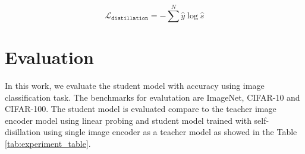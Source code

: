\begin{equation}
    \label{eq:loss_self_dist}
    \mathcal{L}_{\texttt{distillation}} = -\sum^{N} \hat{y}\log\hat{s}
\end{equation}



\section{Evaluation}
In this work, we evaluate the student model with accuracy using image classification task.
The benchmarks for evalutation are ImageNet, CIFAR-10 and CIFAR-100.
The student model is evaluated compare to the teacher image encoder model using linear probing and student model trained with self-disillation using single image encoder as a teacher model as showed in the Table \ref{tab:experiment_table}.

